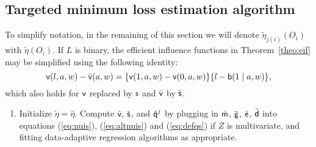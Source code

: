 \subsection{Targeted minimum loss estimation algorithm}

To simplify notation, in the remaining of this section we will denote
$\tilde \eta_{j(i)}(O_i)$ with $\tilde \eta(O_i)$. If $L$ is binary,
the efficient influence functions in Theorem~\ref{theo:eif} may be
simplified using the following identity:
\[ \mathsf{v}(l,a,w) - \bar{\mathsf{v}}(a,w) = \{\mathsf{v}(1,a,w) -\mathsf{v}(0,a,w)\}
\{l-\mathsf{b}(1\mid a, w)\},\] which also holds for $\mathsf{v}$ replaced by $\mathsf{s}$ and
$\bar{\mathsf{v}}$ by $\bar{\mathsf{s}}$.

\begin{enumerate}[label=Step \arabic*., align=left, leftmargin=*]
\item Initialize $\tilde\eta =\hat\eta$. Compute $\tilde{\mathsf{v}}$,
  $\tilde{\mathsf{s}}$, and $\tilde{\mathsf{q}}^j$ by plugging in $\tilde {\mathsf{m}}$,
  $\tilde {\mathsf{g}}$, $\tilde {\mathsf{e}}$, $\tilde {\mathsf{d}}$ into equations
  (\ref{eq:nuis}), (\ref{eq:altnuis}) and (\ref{eq:defqs}) if
  $Z$ is multivariate, and fitting data-adaptive regression algorithms as
  appropriate.


\end{enumerate}
